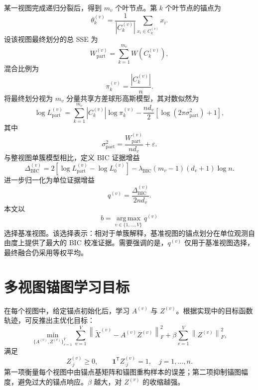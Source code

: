 \documentclass[UTF8,a4paper,12pt,fontset=none]{ctexart}
\newcommand{\argmax}{\operatorname*{arg\,max}}
\newcommand{\epsv}{\varepsilon}
\newcommand{\BIC}{\mathrm{BIC}}
\newcommand{\one}{\mathbf{1}}
\newcommand{\T}{\mathsf{T}}
\begin{document}
某一视图完成递归分裂后，得到 \(m_v\) 个叶节点。第 \(k\) 个叶节点的锚点为
\begin{equation}
\theta_k^{(v)}
=\frac{1}{|C_k^{(v)}|}
\sum_{x_i\in C_k^{(v)}}x_i .
\end{equation}
设该视图最终划分的总 SSE 为
\begin{equation}
W_{\mathrm{part}}^{(v)}
=\sum_{k=1}^{m_v}W(C_k^{(v)}),
\end{equation}
混合比例为
\begin{equation}
\pi_k^{(v)}=\frac{|C_k^{(v)}|}{n}.
\end{equation}
将最终划分视为 \(m_v\) 分量共享方差球形高斯模型，其对数似然为
\begin{equation}
\log L_{\mathrm{part}}^{(v)}
=
\sum_{k=1}^{m_v}|C_k^{(v)}|\log \pi_k^{(v)}
-\frac{nd_v}{2}
\left[
\log(2\pi\sigma_{\mathrm{part}}^2)+1
\right],
\end{equation}
其中
\begin{equation}
\sigma_{\mathrm{part}}^2
=\frac{W_{\mathrm{part}}^{(v)}}{nd_v}+\epsv .
\end{equation}
与整视图单簇模型相比，定义 BIC 证据增益
\begin{equation}
\Delta_{\BIC}^{(v)}
=
2\left[
\log L_{\mathrm{part}}^{(v)}
-\log L_0^{(v)}
\right]
-\lambda_{\BIC}(m_v-1)(d_v+1)\log n .
\end{equation}
进一步归一化为单位证据增益
\begin{equation}
q^{(v)}
=
\frac{\Delta_{\BIC}^{(v)}}{2nd_v}.
\end{equation}
本文以
\begin{equation}
b=\argmax_{v\in\{1,\ldots,V\}} q^{(v)}
\end{equation}
选择基准视图。该选择表示：相对于单簇解释，基准视图的锚点划分在单位观测自由度上提供了最大的 BIC 校准证据。需要强调的是，\(q^{(v)}\) 仅用于基准视图选择，最终融合仍采用等权平均。

\section{多视图锚图学习目标}

在每个视图中，给定锚点初始化后，学习 \(A^{(v)}\) 与 \(Z^{(v)}\)。根据实现中的目标函数轨迹，可反推出主优化目标：
\begin{equation}
\min_{\{A^{(v)},Z^{(v)}\}_{v=1}^{V}}
\sum_{v=1}^{V}
\left\|
\widetilde X^{(v)}-A^{(v)}Z^{(v)}
\right\|_F^2
+
\beta
\sum_{v=1}^{V}
\left\|Z^{(v)}\right\|_F^2 ,
\label{eq:main_objective}
\end{equation}
满足
\begin{equation}
Z_{\cdot j}^{(v)}\ge0,\qquad
\one^\T Z_{\cdot j}^{(v)}=1,
\quad
j=1,\ldots,n.
\label{eq:z_simplex}
\end{equation}
第一项衡量每个视图中由锚点基矩阵和锚图重构样本的误差；第二项抑制锚图幅度，避免过大的锚点响应。\(\beta\) 越大，对 \(Z^{(v)}\) 的收缩越强。
\end{document}
